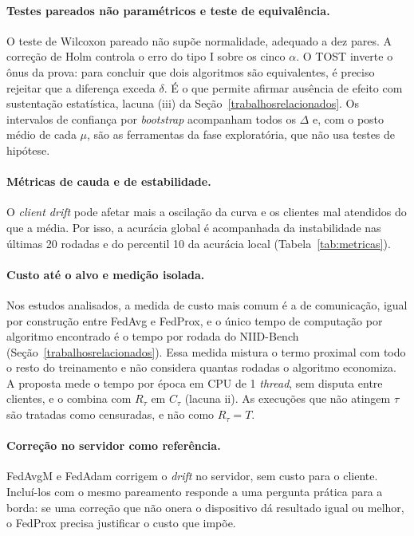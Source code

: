 \paragraph{Testes pareados não paramétricos e teste de equivalência.} O teste de Wilcoxon pareado \citep{wilcoxon1945} não supõe normalidade, adequado a dez pares. A correção de Holm controla o erro do tipo I sobre os cinco $\alpha$. O TOST \citep{schuirmann1987tost} inverte o ônus da prova: para concluir que dois algoritmos são equivalentes, é preciso rejeitar que a diferença exceda $\delta$. É o que permite afirmar ausência de efeito com sustentação estatística, lacuna (iii) da Seção~\ref{trabalhosrelacionados}. Os intervalos de confiança por \textit{bootstrap} acompanham todos os $\Delta$ e, com o posto médio de cada $\mu$, são as ferramentas da fase exploratória, que não usa testes de hipótese.

\paragraph{Métricas de cauda e de estabilidade.} O \textit{client drift} pode afetar mais a oscilação da curva e os clientes mal atendidos do que a média. Por isso, a acurácia global é acompanhada da instabilidade nas últimas 20 rodadas e do percentil 10 da acurácia local (Tabela~\ref{tab:metricas}).

\paragraph{Custo até o alvo e medição isolada.} Nos estudos analisados, a medida de custo mais comum é a de comunicação, igual por construção entre FedAvg e FedProx, e o único tempo de computação por algoritmo encontrado é o tempo por rodada do NIID-Bench (Seção~\ref{trabalhosrelacionados}). Essa medida mistura o termo proximal com todo o resto do treinamento e não considera quantas rodadas o algoritmo economiza. A proposta mede o tempo por época em CPU de 1 \textit{thread}, sem disputa entre clientes, e o combina com $R_\tau$ em $C_\tau$ (lacuna ii). As execuções que não atingem $\tau$ são tratadas como censuradas, e não como $R_\tau = T$.

\paragraph{Correção no servidor como referência.} FedAvgM \citep{hsu2019fedavgm} e FedAdam \citep{reddi2021adaptive} corrigem o \textit{drift} no servidor, sem custo para o cliente. Incluí-los com o mesmo pareamento responde a uma pergunta prática para a borda: se uma correção que não onera o dispositivo dá resultado igual ou melhor, o FedProx precisa justificar o custo que impõe.

